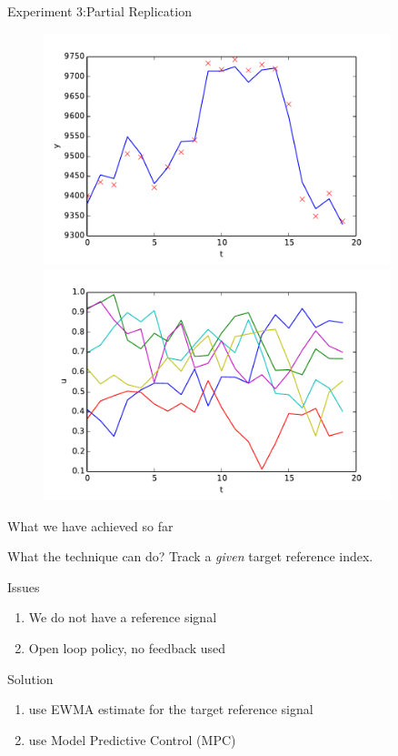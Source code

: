 \documentclass[handout]{beamer}
\begin{document}
\begin{frame}{Experiment 3:Partial Replication}
   \begin{figure}
    \centering
    \includegraphics[width = 0.9\textwidth, height=0.4\textheight]{figure/DAXPartial-y.pdf}\\
    \includegraphics[width = 0.9\textwidth, height=0.4\textheight]{figure/DAXPartial-u.pdf}
	\end{figure}
\end{frame}


\begin{frame}{What we have achieved so far}
\begin{block}{What the technique can do?}
Track a \emph{given} target reference index.
\end{block}

\begin{block}{Issues}
\begin{enumerate}
\item We do not have a reference signal
\item Open loop policy, no feedback used
\end{enumerate}
\end{block}

\begin{block}{Solution}
\begin{enumerate}
\item use EWMA estimate for the target reference signal
\item use Model Predictive Control (MPC)
\end{enumerate}
\end{block}
\end{frame}
\end{document}
